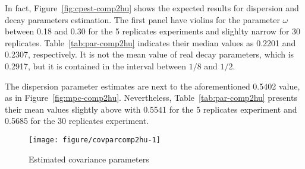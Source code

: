 In fact, Figure~\ref{fig:cpest-comp2hu} shows the expected results for dispersion and decay parameters estimation. The first panel have violins for the parameter $\omega$ between 0.18 and 0.30 for the 5 replicates experiments and slighlty narrow for 30 replicates. Table~\ref{tab:par-comp2hu} indicates their median values as 0.2201 and 0.2307, respectively. It is not the mean value of real decay parameters, which is 0.2917, but it is contained in the interval between $1/8$ and $1/2$.

The dispersion parameter estimates are next to the aforementioned 0.5402 value, as in Figure~\ref{fig:mpc-comp2hu}. Nevertheless, Table~\ref{tab:par-comp2hu} presents their mean values slightly above with 0.5541 for the 5 replicates experiment and 0.5685 for the 30 replicates experiment.


\begin{figure}[t]
  \centering
\begin{knitrout}
\color{fgcolor}
\texttt{[image: figure/covparcomp2hu-1]} 

\end{knitrout}
    \caption{Estimated covariance parameters} \label{fig:cpest-comp2hu}
  \label{fig:cp-comp2hu}
\end{figure}



